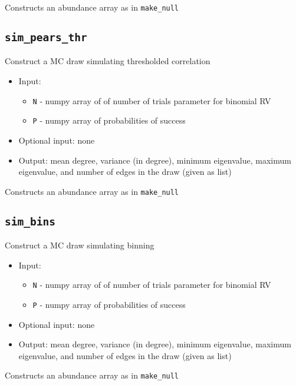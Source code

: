 \documentclass[10pt]{article}
\theoremstyle{definition}
\numberwithin{theorem}{section}
\numberwithin{definition}{section}
\numberwithin{lemma}{section}
\numberwithin{corollary}{section}
\numberwithin{clm}{section}
\numberwithin{rmk}{section}
\begin{document}
Constructs an abundance array as in \verb|make_null|

\cprotect \subsection{\verb|sim_pears_thr|}

Construct a MC draw simulating thresholded correlation
\begin{itemize}
	\item Input: 
	\begin{itemize}
		\item \verb|N| - numpy array of of number of trials parameter for binomial RV
		\item  \verb|P| - numpy array of probabilities of success
	\end{itemize}
	\item Optional input: none
	\item Output: mean degree, variance (in degree), minimum eigenvalue, maximum eigenvalue, and number of edges in the draw (given as list)
\end{itemize}

Constructs an abundance array as in \verb|make_null|

\cprotect \subsection{\verb|sim_bins|}

Construct a MC draw simulating binning
\begin{itemize}
	\item Input: 
	\begin{itemize}
		\item \verb|N| - numpy array of of number of trials parameter for binomial RV
		\item  \verb|P| - numpy array of probabilities of success
	\end{itemize}
	\item Optional input: none
	\item Output: mean degree, variance (in degree), minimum eigenvalue, maximum eigenvalue, and number of edges in the draw (given as list)
\end{itemize}

Constructs an abundance array as in \verb|make_null|
\end{document}
